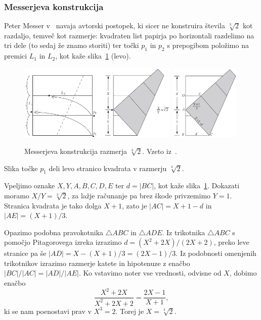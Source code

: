 \subsubsection*{Messerjeva konstrukcija}

Peter Messer v~\cite{messer1986} navaja avtorski postopek, ki sicer ne konstruira števila $\sqrt[3]{2}$ kot razdaljo, temveč kot razmerje: kvadraten list papirja po horizontali razdelimo na tri dele (to sedaj že znamo storiti) ter točki $p_1$ in $p_2$ s prepogibom položimo na premici $L_1$ in $L_2$, kot kaže slika~\ref{fig:messer} (levo).
\begin{figure}[h]
    \centering
    \includegraphics[width=0.68\textwidth]{images/starogr_problemi/messer1.png}
    \includegraphics[width=0.3\textwidth]{images/starogr_problemi/messer2.png}
    \caption[Messerjeva konstrukcija]{Messerjeva konstrukcija razmerja $\sqrt[3]{2}$. Vzeto iz~\cite[str.\ 67--68]{hull2013}.}
    \label{fig:messer}
\end{figure}
\begin{trditev}
    Slika točke $p_1$ deli levo stranico kvadrata v razmerju $\sqrt[3]{2}$.
\end{trditev}
\begin{dokaz}
    Vpeljimo oznake $X, Y, A, B, C, D, E$ ter $d = |BC|$, kot kaže slika~\ref{fig:messer}. Dokazati moramo $X/Y = \sqrt[3]{2}$, za lažje računanje pa brez škode privzemimo $Y=1$. Stranica kvadrata je tako dolga $X+1$, zato je $|AC| = X+1-d$ in $|AE| = (X+1)/3$.

    Opazimo podobna pravokotnika $\triangle ABC$ in $\triangle ADE$. Iz trikotnika $\triangle ABC$ s pomočjo Pitagorovega izreka izrazimo $d = (X^2+2X)/(2X+2)$, preko leve stranice pa še $|AD| = X - (X+1)/3 = (2X-1)/3$. Iz podobnosti omenjenih trikotnikov izrazimo razmerje katete in hipotenuze z enačbo $|BC|/|AC| = |AD|/|AE|$. Ko vstavimo noter vse vrednosti, odvisne od $X$, dobimo enačbo
    $$ \frac{X^2 + 2X}{X^2 + 2X + 2} = \frac{2X - 1}{X + 1},$$
    ki se nam poenostavi prav v $X^3 = 2$. Torej je $X = \sqrt[3]{2}$.
\end{dokaz}
